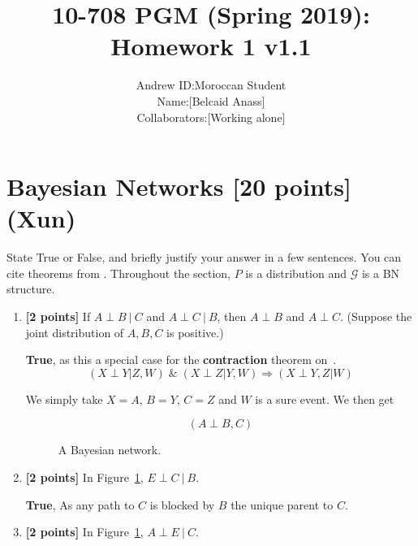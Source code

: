 \documentclass[12pt]{article} \usepackage[utf8]{inputenc}
\title{10-708 PGM (Spring 2019): Homework 1
{\color{red} v1.1}
}
\author{
\begin{tabular}{rl}
Andrew ID: & Moroccan Student\\
Name: & [Belcaid Anass] \\
Collaborators: & [Working alone]
\end{tabular}
}
\date{}
\newcommand{\Gcal}{\mathcal{G}}
\begin{document}
\maketitle



\section{Bayesian Networks [20 points] (Xun)}

State True or False, and briefly justify your answer in a few sentences. You can cite theorems from \citet{koller2009probabilistic}. Throughout the section, $P$ is a distribution and $\Gcal$ is a BN structure. 

\begin{enumerate}

\item \textbf{[2 points]} If $ A \perp B \ | \ C $ and $ A \perp C \ | \ B $, then $ A \perp B $ and $ A \perp C $. 
(Suppose the joint distribution of $ A, B, C $ is positive.)

\begin{solution}
 \textbf{True}, as this a special case for the \textbf{contraction} theorem
 on~\cite{koller2009probabilistic}. 
\[
  (X \perp Y | Z, W)\;\&\;(X \perp Z | Y, W) \Longrightarrow (X \perp Y, Z | W)
\]

We simply take $X=A$, $B=Y$, $C=Z$ and $W$ is a sure event. We then get

\[
  (A \perp B, C)
\]

\end{solution}

\begin{figure}[h]
\centering
{}
\caption{A Bayesian network.}
\label{fig:y-bayesnet}
\end{figure}


\item \textbf{[2 points]} In Figure~\ref{fig:y-bayesnet}, $ E \perp C \ | \ B $.

\begin{solution}
  \textbf{True}, As any path to $C$ is blocked by $B$ the unique parent to
  $C$.
\end{solution}

\item \textbf{[2 points]} In Figure~\ref{fig:y-bayesnet}, $ A \perp E \ | \ C $.


\end{enumerate}
\end{document}
